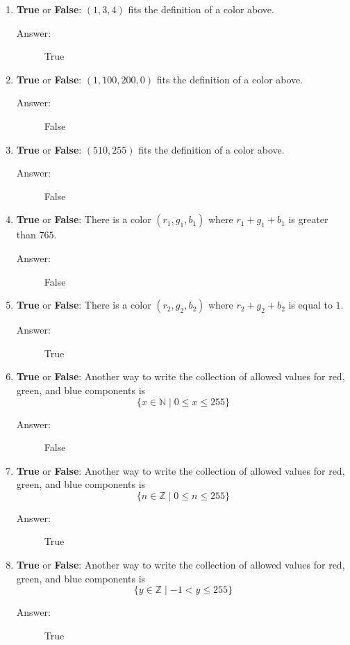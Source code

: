 \documentclass[12pt, oneside]{article}
\begin{document}
\begin{enumerate}
\begin{enumerate}
\item \textbf{True} or \textbf{False}: $(1, 3, 4)$ fits the definition of a color above.
\begin{description}
  \item[Answer:] True
\end{description}
\item \textbf{True} or \textbf{False}: $(1, 100, 200, 0)$ fits the definition of a color above.
\begin{description}
  \item[Answer:] False
\end{description}
\item \textbf{True} or \textbf{False}: $(510, 255)$ fits the definition of a color above.
\begin{description}
  \item[Answer:] False
\end{description}
\item \textbf{True} or \textbf{False}: There is a color $(r_1, g_1, b_1)$ where $r_1 + g_1 + b_1$ is greater than $765$.
\begin{description}
  \item[Answer:] False
\end{description}
\item \textbf{True} or \textbf{False}: There is a color $(r_2, g_2, b_2)$ where $r_2 + g_2 + b_2$ is equal to $1$.
\begin{description}
  \item[Answer:] True
\end{description}
\item \textbf{True} or \textbf{False}: Another way to write the collection of allowed values for red, green, and blue components is $$\{x \in \mathbb{N}\mid 0 \leq x \leq 255 \}$$
\begin{description}
  \item[Answer:] False
\end{description}
\item \textbf{True} or \textbf{False}: Another way to write the collection of allowed values for red, green, and blue components is $$\{n \in \mathbb{Z}\mid 0 \leq n \leq 255 \}$$
\begin{description}
  \item[Answer:] True
\end{description}
\item \textbf{True} or \textbf{False}: Another way to write the collection of allowed values for red, green, and blue components is $$\{y \in \mathbb{Z}\mid -1 < y \leq 255 \}$$
\begin{description}
  \item[Answer:] True
\end{description}
\end{enumerate}


\end{enumerate}
\end{document}
